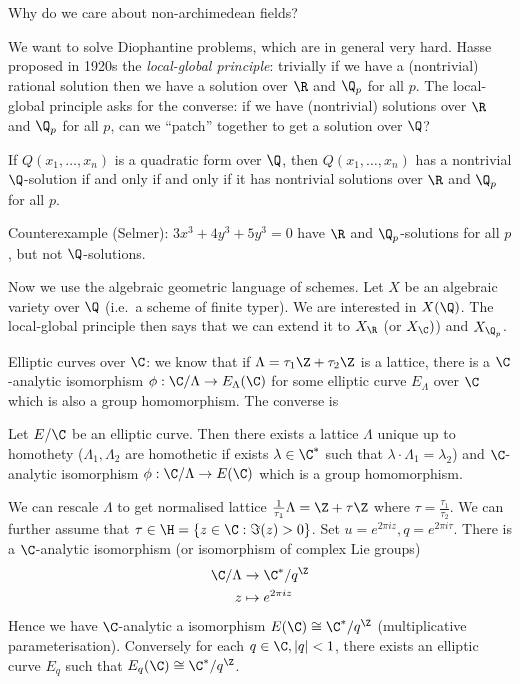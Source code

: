 \documentclass[a4paper]{article}
\begin{document}
Why do we care about non-archimedean fields?

We want to solve Diophantine problems, which are in general very hard. Hasse proposed in 1920s the \emph{local-global principle}: trivially if we have a (nontrivial) rational solution then we have a solution over \(\R\) and \(\Q_p\) for all \(p\). The local-global principle asks for the converse: if we have (nontrivial) solutions over \(\R\) and \(\Q_p\) for all \(p\), can we ``patch'' together to get a solution over \(\Q\)?

\begin{theorem}
  If \(Q(x_1, \dots, x_n)\) is a quadratic form over \(\Q\), then \(Q(x_1, \dots, x_n)\) has a nontrivial \(\Q\)-solution if and only if and only if it has nontrivial solutions over \(\R\) and \(\Q_p\) for all \(p\).
\end{theorem}

Counterexample (Selmer): \(3x^3 + 4y^3 + 5y^3 = 0\) have \(\R\) and \(\Q_p\)-solutions for all \(p\), but not \(\Q\)-solutions.

Now we use the algebraic geometric language of schemes. Let \(X\) be an algebraic variety over \(\Q\) (i.e.\ a scheme of finite typer). We are interested in \(X(\Q)\). The local-global principle then says that we can extend it to \(X_\R\) (or \(X_\C)\)) and \(X_{\Q_p}\).

Elliptic curves over \(\C\): we know that if \(\Lambda = \tau_1 \Z + \tau_2 \Z\) is a lattice, there is a \(\C\)-analytic isomorphism \(\phi: \C/\Lambda \to E_\Lambda(\C)\) for some elliptic curve \(E_\Lambda\) over \(\C\) which is also a group homomorphism. The converse is

\begin{theorem}
  Let \(E/\C\) be an elliptic curve. Then there exists a lattice \(\Lambda\) unique up to homothety (\(\Lambda_1, \Lambda_2\) are homothetic if exists \(\lambda \in \C^*\) such that \(\lambda \cdot \Lambda_1 = \lambda_2\)) and \(\C\)-analytic isomorphism \(\phi: \C/\Lambda \to E(\C)\) which is a group homomorphism.
\end{theorem}

We can rescale \(\Lambda\) to get normalised lattice \(\frac{1}{\tau_1}\Lambda = \Z + \tau \Z\) where \(\tau = \frac{\tau_1}{\tau_2}\). We can further assume that \(\tau \in \H = \{z \in \C: \Im(z) > 0\}\). Set \(u = e^{2\pi i z}, q = e^{2\pi i \tau}\). There is a \(\C\)-analytic isomorphism (or isomorphism of complex Lie groups)
\begin{align*}
  \C/\Lambda &\to \C^*/q^\Z \\
  z &\mapsto e^{2\pi i z}
\end{align*}
Hence we have \(\C\)-analytic a isomorphism \(E(\C) \cong \C^*/q^\Z\) (multiplicative parameterisation). Conversely for each \(q \in \C, |q| < 1\), there exists an elliptic curve \(E_q\) such that \(E_q(\C) \cong \C^*/q^\Z\).
\end{document}
